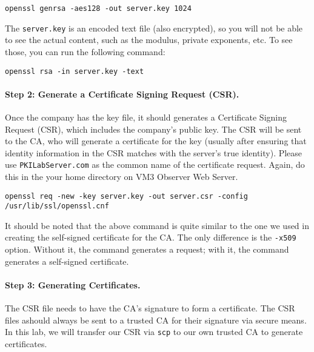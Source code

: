 \documentclass{article}
\begin{document}
\begin{verbatim}
openssl genrsa -aes128 -out server.key 1024
\end{verbatim}

The {\tt server.key} is an encoded text file (also encrypted), 
so you will not be able to see the actual content, such as the modulus, private exponents, etc. To see
those, you can run the following command:

\begin{verbatim}
openssl rsa -in server.key -text
\end{verbatim}


\paragraph{Step 2: Generate a Certificate Signing Request (CSR).}
Once the company has the key file, it should generates a Certificate Signing Request (CSR), which  includes the company's public key. 
The CSR will be sent to the CA, who will generate a certificate 
for the key (usually after ensuring that identity information in 
the CSR matches with the server's true identity). Please 
use {\tt PKILabServer.com} as the common name of the certificate 
request. Again, do this in the your home directory on VM3 Observer Web Server.

\begin{verbatim}
openssl req -new -key server.key -out server.csr -config /usr/lib/ssl/openssl.cnf
\end{verbatim}


It should be noted that the above command is quite similar to the one
we used in creating the self-signed certificate for the CA. The only
difference is the {\tt -x509} option. Without it, the command 
generates a request; with it, the command generates a self-signed 
certificate.


\paragraph{Step 3: Generating Certificates.}
The CSR file needs to have the CA's signature to form a certificate. The CSR files ashould always be sent to a trusted CA for their signature via secure means. In this lab, we will transfer our CSR via {\tt scp} to our own trusted CA to generate certificates.\\

\end{document}

